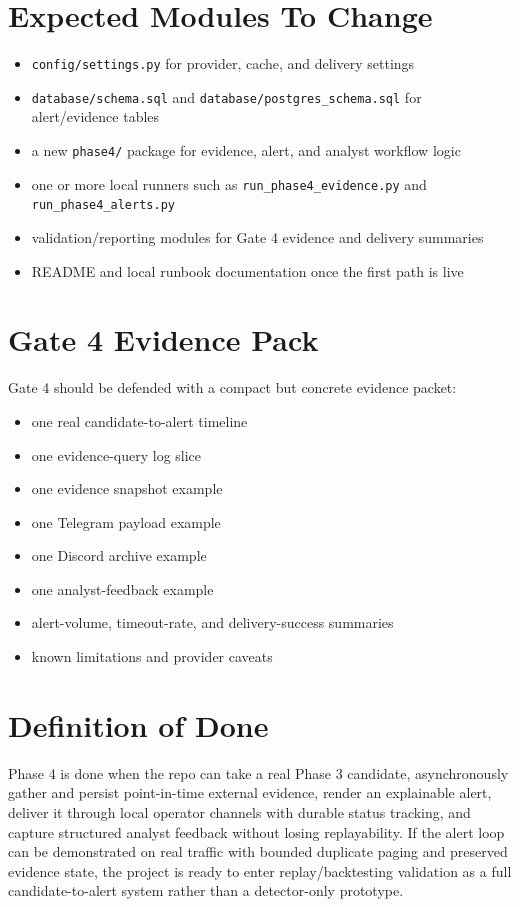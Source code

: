 \documentclass{article}
\begin{document}
\section*{Expected Modules To Change}
\begin{itemize}
\item \texttt{config/settings.py} for provider, cache, and delivery settings
\item \texttt{database/schema.sql} and \texttt{database/postgres\_schema.sql} for alert/evidence tables
\item a new \texttt{phase4/} package for evidence, alert, and analyst workflow logic
\item one or more local runners such as \texttt{run\_phase4\_evidence.py} and \texttt{run\_phase4\_alerts.py}
\item validation/reporting modules for Gate 4 evidence and delivery summaries
\item README and local runbook documentation once the first path is live
\end{itemize}

\section*{Gate 4 Evidence Pack}
Gate 4 should be defended with a compact but concrete evidence packet:
\begin{itemize}
\item one real candidate-to-alert timeline
\item one evidence-query log slice
\item one evidence snapshot example
\item one Telegram payload example
\item one Discord archive example
\item one analyst-feedback example
\item alert-volume, timeout-rate, and delivery-success summaries
\item known limitations and provider caveats
\end{itemize}

\section*{Definition of Done}
Phase 4 is done when the repo can take a real Phase 3 candidate, asynchronously gather and persist point-in-time external evidence, render an explainable alert, deliver it through local operator channels with durable status tracking, and capture structured analyst feedback without losing replayability. If the alert loop can be demonstrated on real traffic with bounded duplicate paging and preserved evidence state, the project is ready to enter replay/backtesting validation as a full candidate-to-alert system rather than a detector-only prototype.
\end{document}
